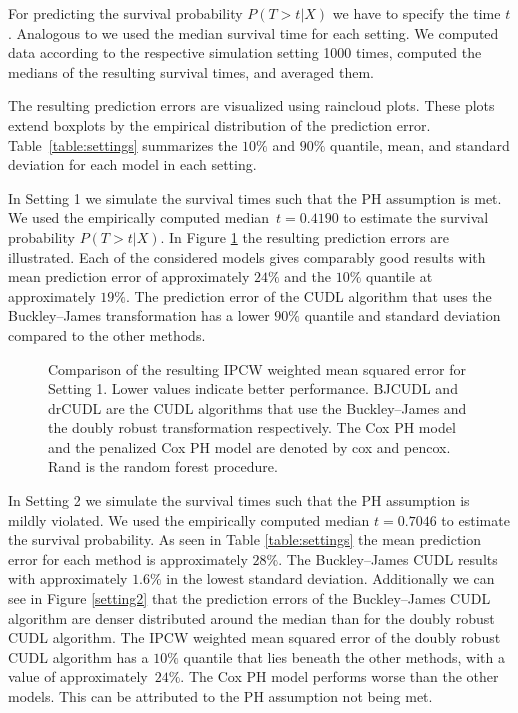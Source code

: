 \documentclass[12pt, a4paper]{scrartcl}
\theoremstyle{definition}
\theoremstyle{plain}
\numberwithin{equation}{section}
\numberwithin{figure}{section}
\numberwithin{table}{section}
\begin{document}
	For predicting the survival probability $P(T>t\vert X)$ we have to specify the time $t$.
	Analogous to \citet*{basearticle} we used the median survival time for each setting.
	We computed data according to the respective simulation setting 1000 times, computed the medians of the resulting survival times, and averaged them.
	
	The resulting prediction errors are visualized using raincloud plots.
	These plots extend boxplots by the empirical distribution of the prediction error.
	Table~\ref{table:settings} summarizes the $10\%$ and $90\%$ quantile, mean, and standard deviation for each model in each setting.
	
	In Setting 1 we simulate the survival times such that the PH assumption is met.
	We used the empirically computed median~$t = 0.4190$ to estimate the survival probability $P(T>t\vert X)$.
	In Figure \ref{setting1} the resulting prediction errors are illustrated.
	Each of the considered models gives comparably good results with mean prediction error of approximately $24\%$ and the $10\%$ quantile at approximately $19\%$.
	The prediction error of the CUDL algorithm that uses the Buckley--James transformation has a lower $90\%$ quantile and standard deviation compared to the other methods.
	\begin{figure}
		\centering	
		
		\vspace{-0.3cm}
		\caption{Comparison of the resulting IPCW weighted mean squared error for Setting 1. Lower values indicate better performance. BJCUDL and drCUDL are the CUDL algorithms that use the Buckley--James and the doubly robust transformation respectively. The Cox PH model and the penalized Cox PH model are denoted by cox and pencox. Rand is the random forest procedure.}
		\label{setting1}
 	\end{figure}
	
	In Setting 2 we simulate the survival times such that the PH assumption is mildly violated.
	We used the empirically computed median $t = 0.7046$ to estimate the survival probability.
	As seen in Table \ref{table:settings} the mean prediction error for each method is approximately $28\%$.
	The Buckley--James CUDL results with approximately $1.6\%$ in the lowest standard deviation.
	Additionally we can see in Figure \ref{setting2} that the prediction errors of the Buckley--James CUDL algorithm are denser distributed around the median than for the doubly robust CUDL algorithm.
	The IPCW weighted mean squared error of the doubly robust CUDL algorithm has a $10\%$ quantile that lies beneath the other methods, with a value of approximately~$24\%$.
	The Cox PH model performs worse than the other models.
	This can be attributed to the PH assumption not being met.
\end{document}
